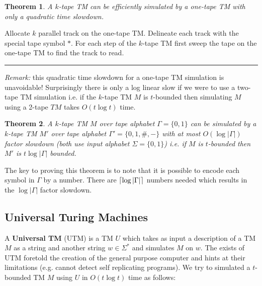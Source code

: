 \documentclass[twoside]{article}
\newcounter{lecnum}
\newtheorem{theorem}{Theorem}[lecnum]
\newenvironment{proof}{{\bf Proof:}}{\hfill\rule{2mm}{2mm}}
\DeclarePairedDelimiter\ceil{\lceil}{\rceil}
\begin{document}
\begin{theorem}
A $k$-tape TM can be \emph{efficiently} simulated by a one-tape TM with only a quadratic time slowdown. 
\end{theorem}
\begin{proof}
Allocate $k$ parallel track on the one-tape TM. Delineate each track with the special tape symbol $*$. For each step of the $k$-tape TM first sweep the tape on the one-tape TM to find the track to read.  
\end{proof}

\emph{Remark:} this quadratic time slowdown for a one-tape TM simulation is unavoidable! Surprisingly there is only a log linear slow if we were to use a two-tape TM simulation i.e. if the $k$-tape TM $M$ is $t$-bounded then simulating $M$ using a 2-tape $TM$ takes $O(t\log t)$ time. 

\begin{theorem}
A $k$-tape TM $M$ over tape alphabet $\Gamma = \{0,1\}$ can be simulated by a $k$-tape TM $M'$ over tape alphabet $\Gamma' = \{0, 1, \#, -\}$ with at most $O(\log|\Gamma|)$ factor slowdown (both use input alphabet $\Sigma = \{0,1\}$) i.e. if $M$ is $t$-bounded then $M'$ is $t\log|\Gamma|$ bounded.  
\end{theorem}  
The key to proving this theorem is to note that it is possible to encode each symbol in $\Gamma$ by a number. There are $\ceil{\log |\Gamma |}$ numbers needed which results in the $\log |\Gamma |$ factor slowdown. 

\subsection{Universal Turing Machines}
A \textbf{Universal TM} (UTM) is a TM $U$ which takes as input a description of a TM $M$ as a string and another string $w \in \Sigma^*$ and simulates $M$ on $w$. The exists of UTM foretold the creation of the general purpose computer and hints at their limitations (e.g. cannot detect self replicating programs). We try to simulated a $t$-bounded TM $M$ using $U$ in $O(t\log t)$ time as follows:
\end{document}

